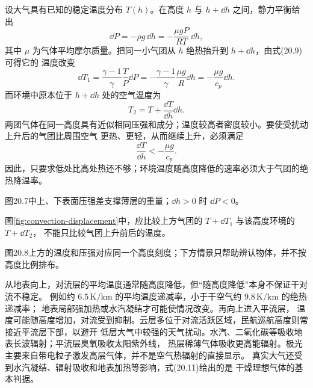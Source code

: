 设大气具有已知的稳定温度分布 $T(h)$。在高度 $h$ 与 $h+\dd h$ 之间，静力平衡给出
\begin{equation*}
  \dd P=-\rho g\,\dd h=-\frac{\mu gP}{RT}\,\dd h,
\end{equation*}
其中 $\mu$ 为气体平均摩尔质量。把同一小气团从 $h$ 绝热抬升到 $h+\dd h$，由式(20.9)可得它的
温度改变
\begin{equation*}
  \dd T_1=\frac{\gamma-1}{\gamma}\frac{T}{P}\dd P
  =-\frac{\gamma-1}{\gamma}\frac{\mu g}{R}\dd h
  =-\frac{\mu g}{c_p}\dd h.
\end{equation*}
而环境中原本位于 $h+\dd h$ 处的空气温度为
\begin{equation*}
  T_2=T+\frac{\dd T}{\dd h}\dd h.
\end{equation*}
两团气体在同一高度具有近似相同压强和成分；温度较高者密度较小。要使受扰动上升后的气团比周围空气
更热、更轻，从而继续上升，必须满足
\begin{equation}
  \boxed{\frac{\dd T}{\dd h}<-\frac{\mu g}{c_p}}. \tag{20.11}
\end{equation}
因此，只要求低处比高处热还不够；环境温度随高度降低的速率必须大于气团的绝热降温率。

\pressureLayerRedraw
{}
图20.7中上、下表面压强差支撑薄层的重量；$\dd h>0$ 时 $\dd P<0$。

\convectionCriterionDiagram
{}\label{fig:convection-displacement}
图\ref{fig:convection-displacement}中，应比较上方气团的 $T+\dd T_1$ 与该高度环境的 $T+\dd T_2$，
不能只比较气团上升前后的温度。

\atmosphereProfileFaithful
{}
图20.8上方的温度和压强对应同一个高度刻度；下方情景只帮助辨认物体，并不按高度比例排布。

从地表向上，对流层的平均温度通常随高度降低，但“随高度降低”本身不保证干对流不稳定。
例如约 $6.5\,\mathrm{K/km}$ 的平均温度递减率，小于干空气约 $9.8\,\mathrm{K/km}$ 的绝热递减率；
地表局部强加热或水汽凝结才可能使情况改变。再向上进入平流层，
温度可能随高度增加，对流受到抑制。云层多位于对流活跃区域，民航巡航高度则常接近平流层下部，以避开
低层大气中较强的天气扰动。水汽、二氧化碳等吸收地表长波辐射；平流层臭氧吸收太阳紫外线，
热层稀薄气体吸收更高能辐射。极光主要来自带电粒子激发高层气体，并不是空气热辐射的直接显示。
真实大气还受到水汽凝结、辐射吸收和地表加热等影响，式(20.11)给出的是
干燥理想气体的基本判据。

\setcounter{equation}{11}


